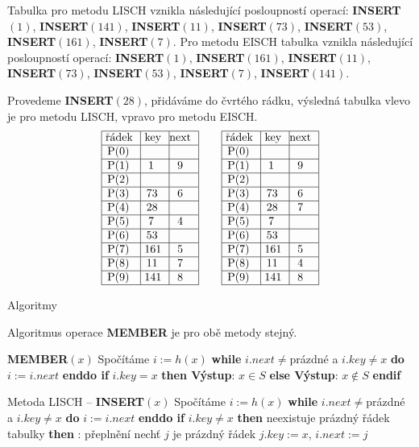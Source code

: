 \documentclass[a4paper,12pt]{article}
\begin{document}
Tabulka pro metodu LISCH vznikla následující posloupností 
operací:\newline 
{\bf INSERT$(1)$}, {\bf INSERT$(141)$}, {\bf INSERT$(11)$}, {\bf INSERT$
(73)$}, 
{\bf INSERT$(53)$},\newline 
{\bf INSERT$(161)$}, {\bf INSERT$(7)$}.\newline 
Pro metodu EISCH tabulka vznikla následující posloupností 
operací:\newline 
{\bf INSERT$(1)$}, {\bf INSERT$(161)$}, {\bf INSERT$(11)$}, {\bf INSERT$
(73)$}, 
{\bf INSERT$(53)$}, {\bf INSERT$(7)$}, {\bf INSERT$(141)$}. 

Provedeme {\bf INSERT$(28)$}, přidáváme do čvrtého rádku, vý\-sled\-ná tabulka vlevo je pro meto\-du 
LISCH, vpravo pro metodu EISCH.
$$\vbox {\hbox{\vtop{\offinterlineskip\halign{\strut\vrule\ # & \vrule\ # & \vrule\hfil# \hfil\vrule\cr\noalign{\hrule}řádek & key & next \hfil\cr\noalign{\hrule}P(0) & &\hfill \cr\noalign{\hrule}P(1) & 1 & 9 \cr\noalign{\hrule}P(2) & &\hfill \cr\noalign{\hrule}P(3) & 73 & 6 \cr\noalign{\hrule}P(4) & 28 &\hfill \cr\noalign{\hrule}P(5) & 7 & 4 \cr\noalign{\hrule}P(6) & 53 &\hfill \cr\noalign{\hrule}P(7) & 161 & 5 \cr\noalign{\hrule}P(8) & 11 & 7 \cr\noalign{\hrule}P(9) & 141 & 8 \cr\noalign{\hrule}}}\qquad\vtop{\offinterlineskip\halign {\strut\vrule\ # & \vrule\ # & \vrule \hfil # \hfil \vrule\cr\noalign{\hrule}řádek & key & next \hfil \cr\noalign{\hrule}P(0) & &\hfill \cr\noalign{\hrule}P(1) & 1 & 9 \cr\noalign{\hrule}P(2) & &\hfill \cr\noalign{\hrule}P(3) & 73 & 6 \cr\noalign{\hrule}P(4) & 28 & 7 \cr\noalign{\hrule}P(5) & 7 & \hfill \cr\noalign{\hrule}P(6) & 53 & \hfill \cr\noalign{\hrule}P(7) & 161 & 5 \cr\noalign{\hrule}P(8) & 11 & 4  \cr\noalign{\hrule}P(9) & 141 & 8 \cr\noalign{\hrule}}}}}$$

\subhead
Algoritmy
\endsubhead

Algoritmus operace {\bf MEMBER} je pro obě metody stejný.
\bigskip

{\bf MEMBER$(x)$}\newline 
Spočítáme $i:=h(x)$\newline 
{\bf while} $i.next\ne$prázdné a $i.key\ne x$ {\bf do} $i:=i.
next$ {\bf enddo \newline 
if} $i.key=x$ {\bf then Výstup}: $x\in S$ {\bf else Výstup}: $
x\notin S$ {\bf endif}
\bigskip

Metoda LISCH -- {\bf INSERT$(x)$}\newline 
Spočítáme $i:=h(x)$\newline 
{\bf while} $i.next\ne$prázdné a $i.key\ne x$ {\bf do} $i:=i.
next$ {\bf enddo \newline 
if} $i.key\ne x$ {\bf then}\newline 
\phantom{---}{\bf if} neexistuje prázdný řádek tabulky {\bf then}\newline 
\phantom{------}{\bf Výstup}: přeplnění\newline 
\phantom{---}{\bf else}\newline 
\phantom{------}nech\v t $j$ je prázdný řádek $j.
key:=x$, 
$i.next:=j$\newline 
\phantom{---}{\bf endif\newline 
endif}
\bigskip
\end{document}
